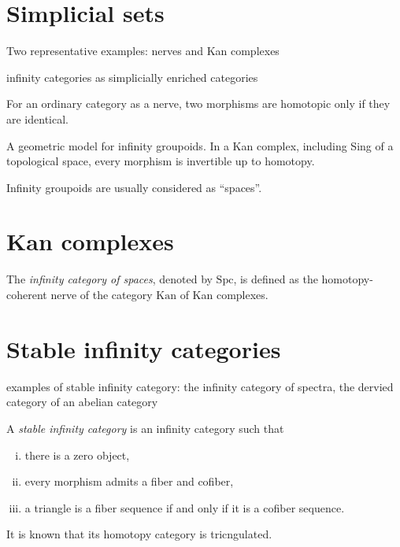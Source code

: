 \documentclass{../../large}
\begin{document}
\section{Simplicial sets}

Two representative examples: nerves and Kan complexes

infinity categories as simplicially enriched categories

\begin{prb}[Nerves]
For an ordinary category as a nerve, two morphisms are homotopic only if they are identical.
\end{prb}

\begin{prb}
A geometric model for infinity groupoids.
In a Kan complex, including Sing of a topological space, every morphism is invertible up to homotopy.

Infinity groupoids are usually considered as ``spaces''.
\end{prb}




\section{Kan complexes}

The \emph{infinity category of spaces}, denoted by $\mathrm{Spc}$, is defined as the homotopy-coherent nerve of the category $\mathrm{Kan}$ of Kan complexes.

\section{Stable infinity categories}

examples of stable infinity category: the infinity category of spectra, the dervied category of an abelian category

\begin{prb}
A \emph{stable infinity category} is an infinity category such that
\begin{enumerate}[(i)]
\item there is a zero object,
\item every morphism admits a fiber and cofiber,
\item a triangle is a fiber sequence if and only if it is a cofiber sequence.
\end{enumerate}
It is known that its homotopy category is tricngulated.
\end{prb}

\begin{prb}
\end{prb}

\begin{prb}
\end{prb}
\end{document}
